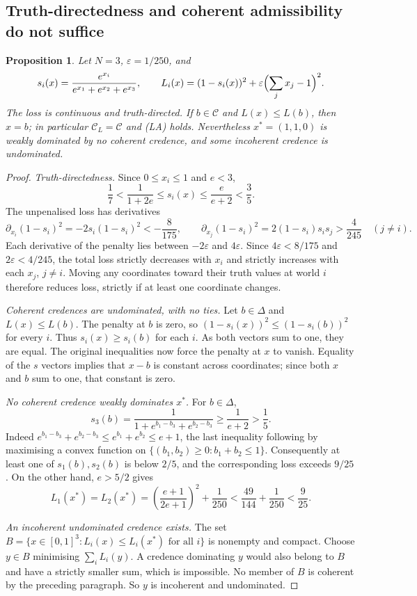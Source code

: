 \documentclass[11pt]{article}
\newtheorem{proposition}[theorem]{Proposition}
\theoremstyle{definition}
\theoremstyle{remark}
\newcommand{\C}{\mathcal C}
\begin{document}
\subsection{Truth-directedness and coherent admissibility do not suffice}
\begin{proposition}\label{prop:joyce-cex}
Let $N=3$, $\varepsilon=1/250$, and
\[
 s_i(x)=\frac{e^{x_i}}{e^{x_1}+e^{x_2}+e^{x_3}},\qquad
 L_i(x)=(1-s_i(x))^2+\varepsilon\Bigl(\sum_jx_j-1\Bigr)^2.
\]
The loss is continuous and truth-directed. If $b\in\C$ and $L(x)\le L(b)$, then $x=b$; in particular $\C_L=\C$ and (LA) holds. Nevertheless $x^*=(1,1,0)$ is weakly dominated by no coherent credence, and some incoherent credence is undominated.
\end{proposition}
\begin{proof}
\emph{Truth-directedness.} Since $0\le x_i\le1$ and $e<3$,
\[
 \frac17<\frac1{1+2e}\le s_i(x)\le\frac e{e+2}<\frac35.
\]
The unpenalised loss has derivatives
\[
 \partial_{x_i}(1-s_i)^2=-2s_i(1-s_i)^2<-\frac8{175},\qquad
 \partial_{x_j}(1-s_i)^2=2(1-s_i)s_is_j>\frac4{245}\quad(j\ne i).
\]
Each derivative of the penalty lies between $-2\varepsilon$ and $4\varepsilon$. Since $4\varepsilon<8/175$ and $2\varepsilon<4/245$, the total loss strictly decreases with $x_i$ and strictly increases with each $x_j$, $j\ne i$. Moving any coordinates toward their truth values at world $i$ therefore reduces loss, strictly if at least one coordinate changes.

\emph{Coherent credences are undominated, with no ties.} Let $b\in\Delta$ and $L(x)\le L(b)$. The penalty at $b$ is zero, so $(1-s_i(x))^2\le(1-s_i(b))^2$ for every $i$. Thus $s_i(x)\ge s_i(b)$ for each $i$. As both vectors sum to one, they are equal. The original inequalities now force the penalty at $x$ to vanish. Equality of the $s$ vectors implies that $x-b$ is constant across coordinates; since both $x$ and $b$ sum to one, that constant is zero.

\emph{No coherent credence weakly dominates $x^*$.} For $b\in\Delta$,
\[
 s_3(b)=\frac1{1+e^{b_1-b_3}+e^{b_2-b_3}}\ge\frac1{e+2}>\frac15.
\]
Indeed $e^{b_1-b_3}+e^{b_2-b_3}\le e^{b_1}+e^{b_2}\le e+1$, the last inequality following by maximising a convex function on $\{(b_1,b_2)\ge0:b_1+b_2\le1\}$. Consequently at least one of $s_1(b),s_2(b)$ is below $2/5$, and the corresponding loss exceeds $9/25$. On the other hand, $e>5/2$ gives
\[
 L_1(x^*)=L_2(x^*)=
 \left(\frac{e+1}{2e+1}\right)^2+\frac1{250}
 <\frac{49}{144}+\frac1{250}<\frac9{25}.
\]

\emph{An incoherent undominated credence exists.} The set $B=\{x\in[0,1]^3:L_i(x)\le L_i(x^*)\text{ for all }i\}$ is nonempty and compact. Choose $y\in B$ minimising $\sum_iL_i(y)$. A credence dominating $y$ would also belong to $B$ and have a strictly smaller sum, which is impossible. No member of $B$ is coherent by the preceding paragraph. So $y$ is incoherent and undominated.
\end{proof}
\end{document}
